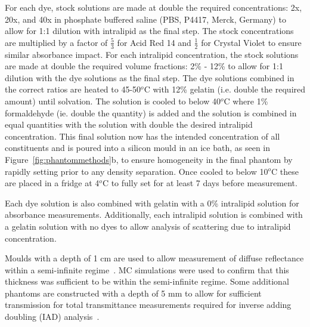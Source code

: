 \label{sec:methodsphantomsynthesis}
For each dye, stock solutions are made at double the required concentrations: 2x, 20x, and 40x in phosphate buffered saline (PBS, P4417, Merck, Germany) to allow for 1:1 dilution with intralipid as the final step. The stock concentrations are multiplied by a factor of $\frac{5}{3}$ for Acid Red 14 and $\frac{1}{2}$ for Crystal Violet to ensure similar absorbance impact. For each intralipid concentration, the stock solutions are made at double the required volume fractions: 2\% - 12\% to allow for 1:1 dilution with the dye solutions as the final step. The dye solutions combined in the correct ratios are heated to 45-50$^o$C with 12\% gelatin (i.e. double the required amount) until solvation. The solution is cooled to below 40$^o$C where 1\% formaldehyde (ie. double the quantity) is added and the solution is combined in equal quantities with the solution with double the desired intralipid concentration. This final solution now has the intended concentration of all constituents and is poured into a silicon mould in an ice bath, as seen in Figure~\ref{fig:phantommethods}b, to ensure homogeneity in the final phantom by rapidly setting prior to any density separation. Once cooled to below 10$^o$C these are placed in a fridge at 4$^o$C to fully set for at least 7 days before measurement. 

Each dye solution is also combined with gelatin with a 0\% intralipid solution for absorbance measurements.
Additionally, each intralipid solution is combined with a gelatin solution with no dyes to allow analysis of scattering due to intralipid concentration.

Moulds with a depth of 1 cm are used to allow measurement of diffuse reflectance within a semi-infinite regime~\citep{Zhang2014}.
MC simulations were used to confirm that this thickness was sufficient to be within the semi-infinite regime.
Some additional phantoms are constructed with a depth of 5 mm to allow for sufficient transmission for total transmittance measurements required for inverse adding doubling (IAD) analysis~\citep{Prahl2017}. 


